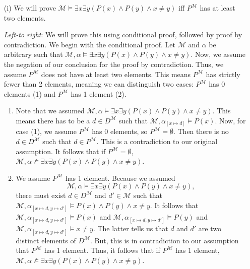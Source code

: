 \begin{enumerate}
  \item[(i)] We will prove $\mathcal{M} \vDash \exists x \exists y (P(x) \wedge P(y) \wedge x \neq y)$ iff $P^{\mathcal{M}}$ has at least two elements.

    \emph{Left-to right}:
    We will prove this using conditional proof, followed by proof by contradiction.
    We begin with the conditional proof.
    Let $\mathcal{M}$ and  $\alpha$ be arbitrary such that
    $\mathcal{M}, \alpha \vDash \exists x \exists y (P(x) \wedge P(y) \wedge x \neq y)$.
    Now, we assume the negation of our conclusion for the proof by contradiction.
    Thus, we assume $P^\mathcal{M}$ does not have at least two elements.
    This means $P^\mathcal{M}$ has strictly fewer than 2 elements, meaning we can distinguish two cases: $P^\mathcal{M}$ has 0 elements (1) and $P^\mathcal{M}$ has 1 element (2).
    \begin{enumerate}[(1)]
      \item Note that we assumed
        $\mathcal{M}, \alpha \vDash \exists x \exists y (P(x) \wedge P(y) \wedge x \neq y)$.
        This means there has to be a $d \in D^\mathcal{M}$ such that
        $\mathcal{M},\alpha_{[x\mapsto d]}\vDash P(x)$.
        Now, for case (1), we assume $P^\mathcal{M}$ has 0 elements, so $P^\mathcal{M} = \emptyset$.
        Then there is no $d \in D^\mathcal{M}$ such that $d \in P^\mathcal{M}$.
        This is a contradiction to our original assumption.
        It follows that if
        $P^\mathcal{M} = \emptyset$, $\mathcal{M}, \alpha \nvDash \exists x \exists y (P(x) \wedge P(y) \wedge x \neq y)$.

      \item We assume $P^\mathcal{M}$ has 1 element.
        Because we assumed
        \[\mathcal{M}, \alpha \vDash \exists x \exists y (P(x) \wedge P(y) \wedge x \neq y),\]
        there must exist $d \in D^\mathcal{M}$ and $d' \in \mathcal{M}$ such that
        $\mathcal{M}, \alpha_{[x \mapsto d, y \mapsto d']} \vDash P(x) \land P(y) \land x\neq y$.
        It follows that
        $\mathcal{M}, \alpha_{[x \mapsto d, y \mapsto d']} \vDash P(x)$
        and
        $\mathcal{M}, \alpha_{[x \mapsto d, y \mapsto d']} \vDash P(y)$
        and
        $\mathcal{M}, \alpha_{[x \mapsto d, y \mapsto d']} \vDash x \neq y$.
        The latter tells us that $d$ and $d'$ are two distinct elements of $D^\mathcal{M}$.
        But, this is in contradiction to our assumption that $P^\mathcal{M}$ has 1 element.
        Thus, it follows that if $P^\mathcal{M}$ has 1 element,
        $\mathcal{M}, \alpha \nvDash \exists x \exists y (P(x) \wedge P(y) \wedge x \neq y)$.


\end{enumerate}
\end{enumerate}
